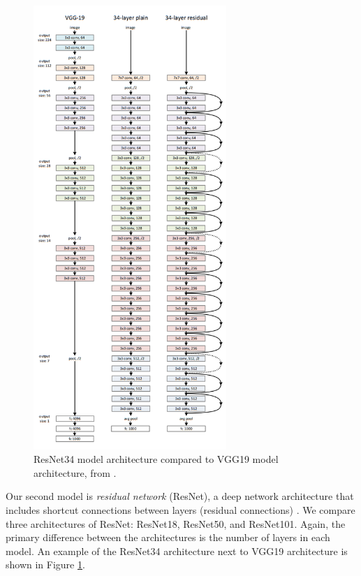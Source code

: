 \documentclass[12pt]{article}
\begin{document}
\begin{figure}
    \centering
    \includegraphics[width=0.65\textwidth]{assets/images/resnet_architecture.png}
    \caption{ResNet34 model architecture compared to VGG19 model architecture,
        from \citeauthor*{he_deep_2015} \cite{he_deep_2015}.}
    \label{fig:resnet_architecture}
\end{figure}

Our second model is \textit{residual network} (ResNet), a deep network
architecture that includes shortcut connections between layers (residual
connections) \cite{he_deep_2015}. We compare three architectures of ResNet:
ResNet18, ResNet50, and ResNet101. Again, the primary difference between the
architectures is the number of layers in each model. An example of the ResNet34
architecture next to VGG19 architecture is shown in Figure
\ref{fig:resnet_architecture}.
\end{document}
